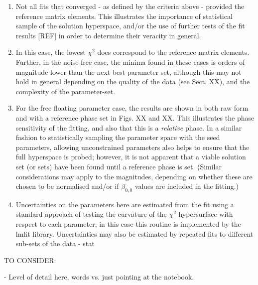 \begin{enumerate}
\item Not all fits that converged - as defined by the criteria above - provided the reference matrix elements. This illustrates the importance of statistical sample of the solution hyperspace, and/or the use of further tests of the fit results [REF] in order to determine their veracity in general.
\item In this case, the lowest $\chi^2$ does correspond to the reference matrix elements. Further, in the noise-free case, the minima found in these cases is orders of magnitude lower than the next best parameter set, although this may not hold in general depending on the quality of the data (see Sect. XX), and the complexity of the parameter-set.
\item For the free floating parameter case, the results are shown in both raw form and with a reference phase set in Figs. XX and XX. This illustrates the phase sensitivity of the fitting, and also that this is a \textit{relative} phase. In a similar fashion to statistically sampling the parameter space with the seed parameters, allowing unconstrained parameters also helps to ensure that the full hyperspace is probed; however, it is not apparent that a viable solution set (or sets) have been found until a reference phase is set. (Similar considerations may apply to the magnitudes, depending on whether these are chosen to be normalised and/or if $\beta_{0,0}$ values are included in the fitting.)
\item Uncertainties on the parameters here are estimated from the fit using a standard approach of testing the curvature of the $\chi^2$ hypersurface with respect to each parameter; in this case this routine is implemented by the lmfit library. Uncertainties may also be estimated by repeated fits to different sub-sets of the data - stat
\end{enumerate}

TO CONSIDER:

- Level of detail here, words vs. just pointing at the notebook.